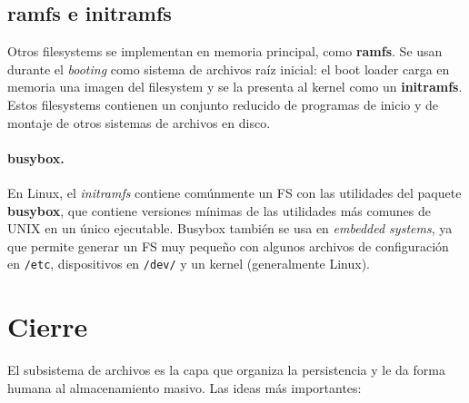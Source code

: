 \documentclass[11pt,a4paper]{article}
\begin{document}
\subsection{ramfs e initramfs}

Otros filesystems se implementan en memoria principal, como
\textbf{ramfs}. Se usan durante el \emph{booting} como sistema de
archivos raíz inicial: el boot loader carga en memoria una imagen del
filesystem y se la presenta al kernel como un \textbf{initramfs}. Estos
filesystems contienen un conjunto reducido de programas de inicio y de
montaje de otros sistemas de archivos en disco.

\paragraph{busybox.}
En Linux, el \emph{initramfs} contiene comúnmente un FS con las
utilidades del paquete \textbf{busybox}, que contiene versiones
mínimas de las utilidades más comunes de UNIX en un único ejecutable.
Busybox también se usa en \emph{embedded systems}, ya que permite
generar un FS muy pequeño con algunos archivos de configuración en
\texttt{/etc}, dispositivos en \verb|/dev/| y un kernel (generalmente
Linux).

\section{Cierre}

El subsistema de archivos es la capa que organiza la persistencia y le
da forma humana al almacenamiento masivo. Las ideas más importantes:
\end{document}
